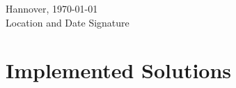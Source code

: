 \documentclass[11pt,DIV=12,BCOR=0mm,twoside,openright,headings=normal,%
  numbers=noenddot,headsepline,headinclude]{scrreprt}
\begin{document}
    \vspace*{3\baselineskip}
    \noindent
    Hannover, \today\\
    Location and Date\hspace{5cm} Signature

    \tableofcontents

    \cleardoublepage

    
    
    
    \chapter{Implemented Solutions}\label{ch:implemented-solutions}
    
    
    
    
    

    \appendix

    

    \renewcommand{\btxfnamespaceshort}{\,}
    
    
\end{document}
